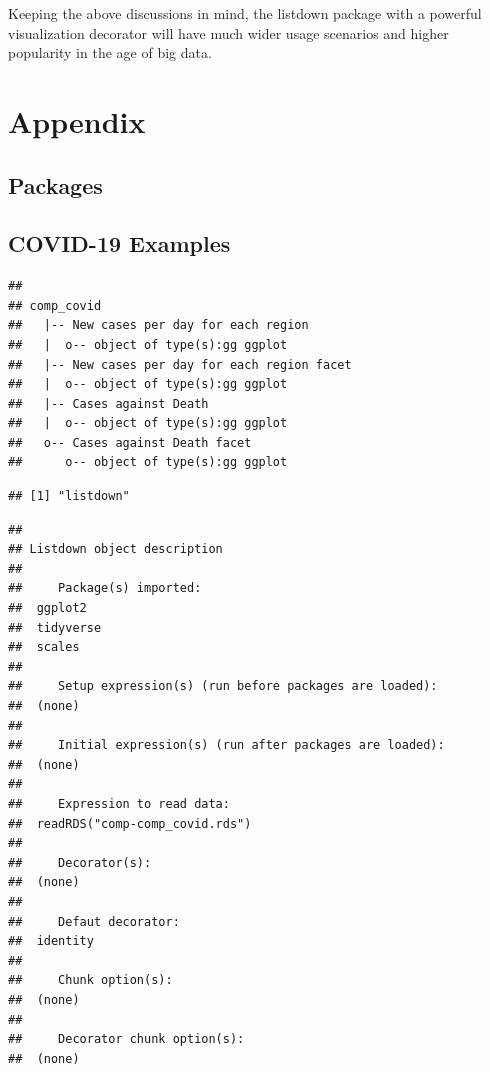 \documentclass[
]{article}
\begin{document}
Keeping the above discussions in mind, the listdown package with a
powerful visualization decorator will have much wider usage scenarios
and higher popularity in the age of big data.

\hypertarget{appendix}{%
\section*{Appendix}\label{appendix}}

\hypertarget{packages}{%
\subsection{Packages}\label{packages}}

\hypertarget{covid-19-examples}{%
\subsection{COVID-19 Examples}\label{covid-19-examples}}

\begin{verbatim}
## 
## comp_covid
##   |-- New cases per day for each region
##   |  o-- object of type(s):gg ggplot
##   |-- New cases per day for each region facet
##   |  o-- object of type(s):gg ggplot
##   |-- Cases against Death
##   |  o-- object of type(s):gg ggplot
##   o-- Cases against Death facet
##      o-- object of type(s):gg ggplot
\end{verbatim}

\begin{verbatim}
## [1] "listdown"
\end{verbatim}

\begin{verbatim}
## 
## Listdown object description
## 
##     Package(s) imported:
##  ggplot2
##  tidyverse
##  scales
## 
##     Setup expression(s) (run before packages are loaded):
##  (none)
## 
##     Initial expression(s) (run after packages are loaded):
##  (none)
## 
##     Expression to read data:
##  readRDS("comp-comp_covid.rds")
## 
##     Decorator(s):
##  (none)
## 
##     Defaut decorator:
##  identity
## 
##     Chunk option(s):
##  (none)
## 
##     Decorator chunk option(s):
##  (none)
\end{verbatim}
\end{document}
